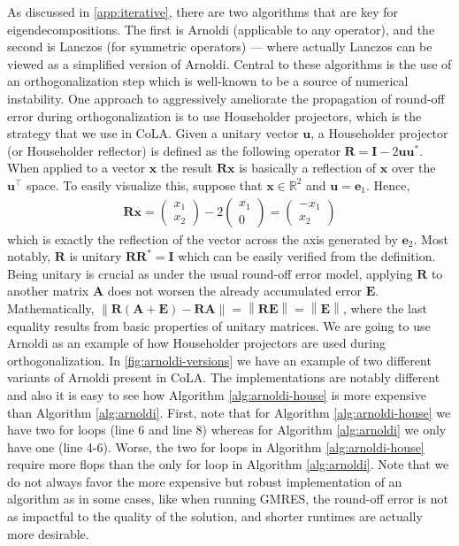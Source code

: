 \documentclass{article}
\newcommand{\norm}[1]{\left\lVert#1\right\rVert}
\newcommand{\mbf}[1]{{\boldsymbol{\mathbf{#1}}}}
\renewcommand{\bm}{\mbf}
\begin{document}
As discussed in \autoref{app:iterative}, there are two algorithms that are key for eigendecompositions.
The first is Arnoldi (applicable to any operator), and the second is Lanczos (for symmetric operators) --- where actually Lanczos can be viewed as a simplified version of Arnoldi.
Central to these algorithms is the use of an orthogonalization step which is well-known to be a source of numerical instability.
One approach to aggressively ameliorate the propagation of round-off error during orthogonalization is to use
Householder projectors, which is the strategy that we use in CoLA.
Given a unitary vector $\bm{u}$, a Householder projector (or Householder reflector)
is defined as the following operator $\bm{R} = \bm{I} - 2 \bm{u} \bm{u}^{*}$.
When applied to a vector $\bm{x}$ the result $\bm{R}\bm{x}$ is basically a reflection of $\bm{x}$ over the $\bm{u}^{\intercal}$ space.
To easily visualize this, suppose that $\bm{x} \in \mathbb{R}^{2}$ and $\bm{u} = \bm{e}_{1}$.
Hence,
\begin{equation*}
    \begin{split}
      \bm{R} \bm{x}
      =
      \begin{pmatrix}
        x_{1} \\ x_{2}
      \end{pmatrix}
      -
      2
      \begin{pmatrix}
        x_{1} \\ 0
      \end{pmatrix}
      =
      \begin{pmatrix}
        -x_{1} \\ x_{2}
      \end{pmatrix}
    \end{split}
\end{equation*}
which is exactly the reflection of the vector across the axis generated by $\bm{e}_{2}$.
Most notably, $\bm{R}$ is unitary $\bm{R} \bm{R}^{*} = \bm{I}$ which can be easily verified from the definition.
Being unitary is crucial as under the usual round-off error model, applying $\bm{R}$
to another matrix $\bm{A}$ does not worsen the already accumulated error $\bm{E}$.
Mathematically, $\norm{\bm{R}\left(\bm{A} + \bm{E}\right) - \bm{R} \bm{A}} = \norm{\bm{R} \bm{E}} = \norm{\bm{E}}$, where the last equality
results from basic properties of unitary matrices.
We are going to use Arnoldi as an example of how Householder projectors are used during orthogonalization.
In \autoref{fig:arnoldi-versions} we have an example of two different variants of
Arnoldi present in CoLA.
The implementations are notably different and also it is easy to see how Algorithm \ref{alg:arnoldi-house} is more expensive
than Algorithm \ref{alg:arnoldi}.
First, note that for Algorithm \ref{alg:arnoldi-house} we have two for loops (line 6 and line 8) whereas for Algorithm \ref{alg:arnoldi} we only have one (line 4-6).
Worse, the two for loops in Algorithm \ref{alg:arnoldi-house} require more flops than the only for loop in Algorithm \ref{alg:arnoldi}.
Note that we do not always favor the more expensive but robust implementation of an algorithm as in some cases, like when running GMRES,
the round-off error is not as impactful to the quality of the solution, and shorter runtimes are actually more desirable.
\end{document}

